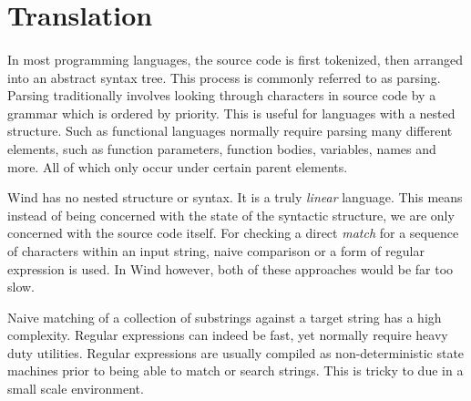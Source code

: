 \section{Translation}

\paragraph{  } In most programming languages, the source code is first tokenized, then arranged into an abstract syntax tree. This process is commonly referred to as parsing. Parsing traditionally involves looking through characters in source code by a grammar which is ordered by priority. This is useful for languages with a nested structure. Such as functional languages normally require parsing many different elements, such as function parameters, function bodies, variables, names and more. All of which only occur under certain parent elements.
\par Wind has no nested structure or syntax. It is a truly \emph{linear} language. This means instead of being concerned with the state of the syntactic structure, we are only concerned with the source code itself. For checking a direct \emph{match} for a sequence of characters within an input string, naive comparison or a form of regular expression is used. In Wind however, both of these approaches would be far too slow.
\par Naive matching of a collection of substrings against a target string has a high complexity. Regular expressions can indeed be fast, yet normally require heavy duty utilities. Regular expressions are usually compiled as non-deterministic state machines prior to being able to match or search strings. This is tricky to due in a small scale environment.